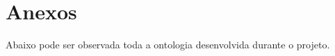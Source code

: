\pagebreak
\section{Anexos} %
\label{sec:anexos}

	Abaixo pode ser observada toda a ontologia desenvolvida durante o projeto.

